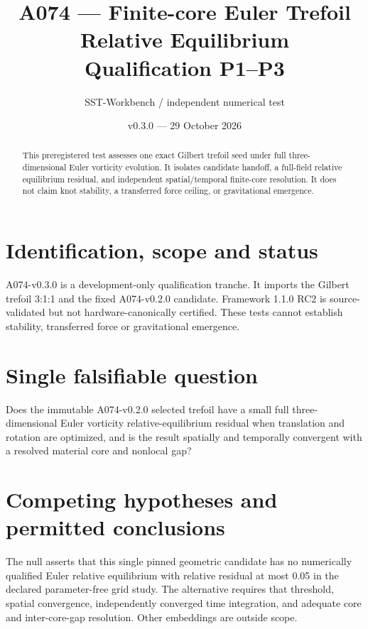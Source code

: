 \documentclass[11pt,a4paper]{article}
\title{A074 --- Finite-core Euler Trefoil Relative Equilibrium\\Qualification P1--P3}
\author{SST-Workbench / independent numerical test}
\date{v0.3.0 --- 29 October 2026}
\begin{document}
\maketitle
\begin{abstract}
This preregistered test assesses one exact Gilbert trefoil seed under full three-dimensional Euler vorticity evolution. It isolates candidate handoff, a full-field relative equilibrium residual, and independent spatial/temporal finite-core resolution. It does not claim knot stability, a transferred force ceiling, or gravitational emergence.
\end{abstract}


\section{Identification, scope and status}

A074-v0.3.0 is a development-only qualification tranche. It imports the Gilbert trefoil 3:1:1 and the fixed A074-v0.2.0 candidate. Framework 1.1.0 RC2 is source-validated but not hardware-canonically certified. These tests cannot establish stability, transferred force or gravitational emergence.


\section{Single falsifiable question}

Does the immutable A074-v0.2.0 selected trefoil have a small full three-dimensional Euler vorticity relative-equilibrium residual when translation and rotation are optimized, and is the result spatially and temporally convergent with a resolved material core and nonlocal gap?


\section{Competing hypotheses and permitted conclusions}

The null asserts that this single pinned geometric candidate has no numerically qualified Euler relative equilibrium with relative residual at most 0.05 in the declared parameter-free grid study. The alternative requires that threshold, spatial convergence, independently converged time integration, and adequate core and inter-core-gap resolution. Other embeddings are outside scope.
\end{document}

